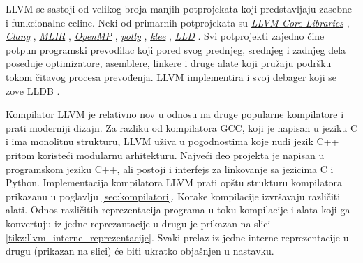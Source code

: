 \documentclass[12pt,oneside]{memoir}
\begin{document}
LLVM se sastoji od velikog broja manjih potprojekata 
koji predstavljaju zasebne i funkcionalne celine. Neki od primarnih potprojekata su 
\href{https://llvm.org/docs/doxygen/group__LLVMCCore.html}{\textit{LLVM Core Libraries}} \cite{llvm_core}, 
\href{https://clang.llvm.org/}{\textit{Clang}} \cite{clang}, 
\href{https://mlir.llvm.org/}{\textit{MLIR}} \cite{mlir}, 
\href{https://openmp.llvm.org/}{\textit{OpenMP}} \cite{openmp}, 
\href{https://polly.llvm.org/}{\textit{polly}} \cite{polly}, 
\href{https://klee-se.org/}{\textit{klee}} \cite{klee}, 
\href{https://lld.llvm.org/}{\textit{LLD}} \cite{llvm_lld}. Svi potprojekti zajedno čine potpun programski prevodilac koji pored 
svog prednjeg, srednjeg i zadnjeg dela poseduje optimizatore, asemblere, linkere i druge alate 
koji pružaju podršku tokom čitavog procesa prevođenja. LLVM implementira i svoj debager koji se 
zove LLDB \cite{lldb}.

Kompilator LLVM je relativno nov u odnosu na druge popularne kompilatore
i prati moderniji dizajn. Za razliku od kompilatora GCC, koji je napisan u
jeziku C i ima monolitnu strukturu, LLVM uživa u pogodnostima koje nudi jezik
C++ pritom koristeći modularnu arhitekturu. Najveći deo projekta je napisan u programskom jeziku C++, ali postoji i interfejs za linkovanje sa jezicima C i Python.
Implementacija kompilatora LLVM prati opštu strukturu kompilatora prikazanu
u poglavlju \ref{sec:kompilatori}. Korake kompilacije izvršavaju različiti alati. Odnos različitih
reprezentacija programa u toku kompilacije i alata koji ga konvertuju iz jedne
reprezantacije u drugu je prikazan na slici \ref{tikz:llvm_interne_reprezentacije}. 
Svaki prelaz iz jedne interne reprezentacije u drugu (prikazan na slici) će biti ukratko objašnjen u nastavku.


\end{document}
